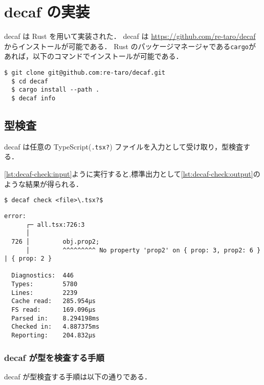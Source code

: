 \chapter{decaf の実装}

decaf は Rust を用いて実装された．
decaf は \href{https://github.com/re-taro/decaf}{https://github.com/re-taro/decaf}からインストールが可能である．
Rust のパッケージマネージャである\texttt{cargo}があれば，以下のコマンドでインストールが可能である．

\begin{lstlisting}[caption=decaf のインストール]
  $ git clone git@github.com:re-taro/decaf.git
  $ cd decaf
  $ cargo install --path .
  $ decaf info
\end{lstlisting}

\section{型検査}

decaf は任意の TypeScript(\texttt{.tsx?}) ファイルを入力として受け取り，型検査する．

\ref{lst:decaf-check:input}ように実行すると,標準出力として\ref{lst:decaf-check:output}のような結果が得られる．

\begin{lstlisting}[caption=decaf の型検査, label=lst:decaf-check:input]
  $ decaf check <file>\.tsx?$
\end{lstlisting}

\begin{lstlisting}[caption=decaf の型検査結果, label=lst:decaf-check:output]
  error:
      ┌─ all.tsx:726:3
      │
  726 │         obj.prop2;
      │         ^^^^^^^^^ No property 'prop2' on { prop: 3, prop2: 6 } | { prop: 2 }

  Diagnostics:	446
  Types:      	5780
  Lines:      	2239
  Cache read: 	285.954µs
  FS read:    	169.096µs
  Parsed in:  	8.294198ms
  Checked in: 	4.887375ms
  Reporting:  	204.832µs
\end{lstlisting}

\subsection{decaf が型を検査する手順}

decaf が型検査する手順は以下の通りである．


